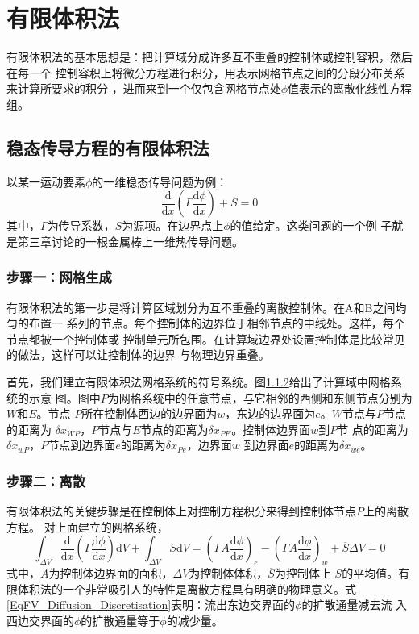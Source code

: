 \chapter{有限体积法}
有限体积法的基本思想是：把计算域分成许多互不重叠的控制体或控制容积，然后在每一个
控制容积上将微分方程进行积分，用表示网格节点之间的分段分布关系来计算所要求的积分
，进而来到一个仅包含网格节点处$\phi$值表示的离散化线性方程组。

\section{稳态传导方程的有限体积法}
以某一运动要素$\phi$的一维稳态传导问题为例：
\begin{equation}
  \frac{\mathrm{d}}{\mathrm{d} x}(\Gamma \frac{\mathrm{d} \phi}{\mathrm{d} x}) +
  S = 0
\end{equation}
其中，$\Gamma$为传导系数，$S$为源项。在边界点上$\phi$的值给定。这类问题的一个例
子就是第三章讨论的一根金属棒上一维热传导问题。

\subsection{步骤一：网格生成}
有限体积法的第一步是将计算区域划分为互不重叠的离散控制体。在A和B之间均匀的布置一
系列的节点。每个控制体的边界位于相邻节点的中线处。这样，每个节点都被一个控制体或
控制单元所包围。在计算域边界处设置控制体是比较常见的做法，这样可以让控制体的边界
与物理边界重叠。

首先，我们建立有限体积法网格系统的符号系统。图\ref{}给出了计算域中网格系统的示意
图。图中$P$为网格系统中的任意节点，与它相邻的西侧和东侧节点分别为$W$和$E$。节点
$P$所在控制体西边的边界面为$w$，东边的边界面为$e$。$W$节点与$P$节点的距离为
$\delta x_{WP}$，$P$节点与$E$节点的距离为$\delta x_{PE}$。控制体边界面$w$到$P$节
点的距离为$\delta x_{wP}$，$P$节点到边界面$e$的距离为$\delta x_{Pe}$，边界面$w$
到边界面$e$的距离为$\delta x_{we}$。

\subsection{步骤二：离散}
有限体积法的关键步骤是在控制体上对控制方程积分来得到控制体节点$P$上的离散方程。
对上面建立的网格系统，
\begin{equation}
  \int_{\Delta V}\!
  \frac{\mathrm{d} }{\mathrm{d} x}
  \left(
    \Gamma \frac{\mathrm{d} \phi}{\mathrm{d} x}
  \right)
  \mathrm{d}V
  +
  \int_{\Delta V}\!
  S
  \mathrm{d}V
  =
  \left(
    \Gamma A\frac{\mathrm{d} \phi}{\mathrm{d} x}
  \right)_{e}
  -
  \left(
    \Gamma A\frac{\mathrm{d} \phi}{\mathrm{d} x}
  \right)_{w}
  +
  \overline{S}\Delta V
  =
  0
  \label{EqFV_Diffusion_Discretisation}
\end{equation}
式中，$A$为控制体边界面的面积，$\Delta V$为控制体体积，$\overline{S}$为控制体上
$S$的平均值。有限体积法的一个非常吸引人的特性是离散方程具有明确的物理意义。式
\eqref{EqFV_Diffusion_Discretisation}表明：流出东边交界面的$\phi$的扩散通量减去流
入西边交界面的$\phi$的扩散通量等于$\phi$的减少量。

